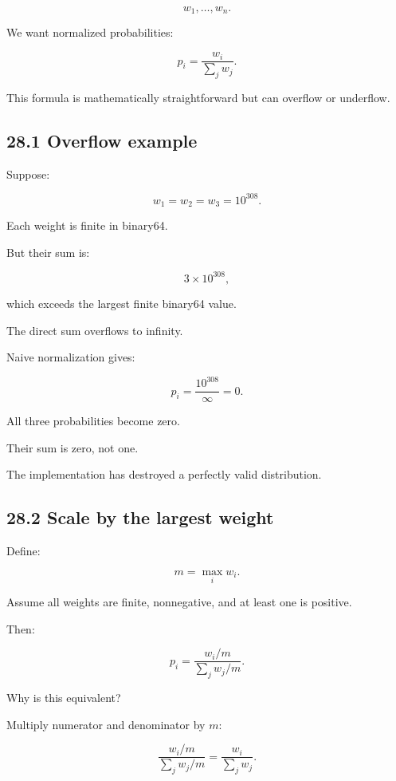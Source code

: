 \[ w_1,\ldots,w_n. \]

We want normalized probabilities:

\[ \boxed{ p_i=\frac{w_i}{\sum_jw_j} }. \]

This formula is mathematically straightforward but can overflow or underflow.

\subsection{28.1 Overflow example}\label{02-foundations-ii-ch031-overflow-example}

\hypertarget{02-foundations-ii-ch031-overflow-example}{}

Suppose:

\[ w_1=w_2=w_3=10^{308}. \]

Each weight is finite in binary64.

But their sum is:

\[ 3\times10^{308}, \]

which exceeds the largest finite binary64 value.

The direct sum overflows to infinity.

Naive normalization gives:

\[ p_i=\frac{10^{308}}{\infty}=0. \]

All three probabilities become zero.

Their sum is zero, not one.

The implementation has destroyed a perfectly valid distribution.

\subsection{28.2 Scale by the largest weight}\label{02-foundations-ii-ch031-scale-by-the-largest-weight}

\hypertarget{02-foundations-ii-ch031-scale-by-the-largest-weight}{}

Define:

\[ \boxed{ m=\max_iw_i }. \]

Assume all weights are finite, nonnegative, and at least one is positive.

Then:

\[ p_i= \frac{w_i/m}{\sum_jw_j/m}. \]

Why is this equivalent?

Multiply numerator and denominator by \(m\):

\[ \frac{w_i/m}{\sum_jw_j/m} = \frac{w_i}{\sum_jw_j}. \]

